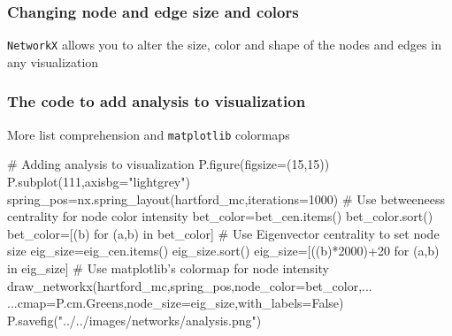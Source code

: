 \documentclass[xcolor=dvipsnames, 9pt]{beamer}
\begin{document}
\begin{frame}[fragile]
    \frametitle{Changing node and edge size and colors}
    \texttt{NetworkX} allows you to alter the size, color and shape of the nodes and edges in any visualization
\end{frame}

\begin{frame}[fragile]
    \frametitle{The code to add analysis to visualization}
    \begin{block}{More list comprehension and \texttt{matplotlib} colormaps}
        \begin{code}
\alert<2>{# Adding analysis to visualization
P.figure(figsize=(15,15))
P.subplot(111,axisbg="lightgrey")
spring_pos=nx.spring_layout(hartford_mc,iterations=1000)}
\alert<3>{# Use betweeneess centrality for node color intensity
bet_color=bet_cen.items()
bet_color.sort()
bet_color=[(b) for (a,b) in bet_color]}
\alert<4>{# Use Eigenvector centrality to set node size
eig_size=eig_cen.items()
eig_size.sort()
eig_size=[((b)*2000)+20 for (a,b) in eig_size]}
\alert<5>{# Use matplotlib's colormap for node intensity 
draw_networkx(hartford_mc,spring_pos,node_color=bet_color,...
    ...cmap=P.cm.Greens,node_size=eig_size,with_labels=False)
P.savefig("../../images/networks/analysis.png")}
        \end{code}
    \end{block}
\end{frame}
\end{document}
